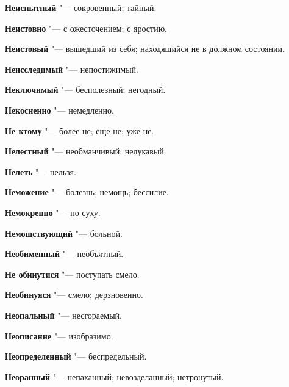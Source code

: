 \begin{mymulticols}{2}
\noindent\textbf{Неиспытный} "--- сокровенный; тайный. 




\noindent\textbf{Неистовно} "--- с ожесточением; с яростию. 




\noindent\textbf{Неистовый} "--- вышедший из себя; находящийся не в должном состоянии. 




\noindent\textbf{Неисследимый} "--- непостижимый. 




\noindent\textbf{Неключимый} "--- бесполезный; негодный. 




\noindent\textbf{Некосненно} "--- немедленно. 




\noindent\textbf{Не ктому} "--- более не; еще не; уже не. 




\noindent\textbf{Нелестный} "--- необманчивый; нелукавый. 




\noindent\textbf{Нелеть} "--- нельзя. 




\noindent\textbf{Неможение} "--- болезнь; немощь; бессилие. 




\noindent\textbf{Немокренно} "--- по суху. 




\noindent\textbf{Немощствующий} "--- больной. 




\noindent\textbf{Необименный} "--- необъятный. 




\noindent\textbf{Не обинутися} "--- поступать смело. 




\noindent\textbf{Необинуяся} "--- смело; дерзновенно. 




\noindent\textbf{Неопальный} "--- несгораемый. 




\noindent\textbf{Неописанне} "--- изобразимо. 




\noindent\textbf{Неопределенный} "--- беспредельный. 




\noindent\textbf{Неоранный} "--- непаханный; невозделанный; нетронутый. 





\end{mymulticols}
